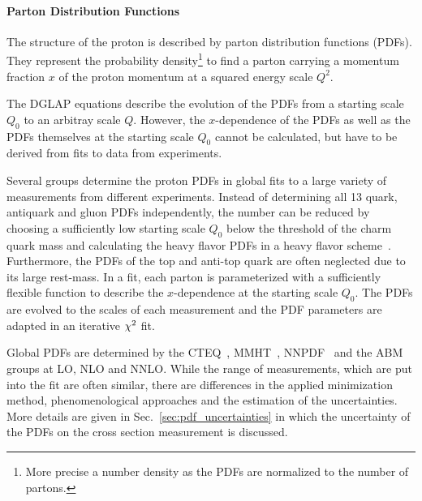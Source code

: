 \paragraph{Parton Distribution Functions}

The structure of the proton is described by parton distribution functions
(PDFs). They represent the probability density\footnote{More precise a number
density as the PDFs are normalized to the number of partons.} to find a parton
carrying a momentum fraction $x$ of the proton momentum at a squared energy
scale $Q^2$. 

The DGLAP equations describe the evolution of the PDFs from a starting scale
$Q_0$ to an arbitray scale $Q$. However, the $x$-dependence of the PDFs as well
as the PDFs themselves at the starting scale $Q_0$ cannot be calculated, but
have to be derived from fits to data from experiments.

Several groups determine the proton PDFs in global fits to a large variety of
measurements from different experiments. Instead of determining all 13 quark,
antiquark and gluon PDFs independently, the number can be reduced by choosing a
sufficiently low starting scale $Q_0$ below the threshold of the charm quark
mass and calculating the heavy flavor PDFs in a heavy flavor
scheme~\cite{Thorne:2006qt}. Furthermore, the PDFs of the top and anti-top quark
are often neglected due to its large rest-mass. In a fit, each parton is
parameterized with a sufficiently flexible function to describe the
$x$-dependence at the starting scale $Q_0$. The PDFs are evolved to the 
scales of each measurement and the PDF parameters are adapted in an iterative
$\chi^2$ fit.

Global PDFs are determined by the
CTEQ~\cite{Dulat:2015mca}, MMHT~\cite{Harland-Lang:2014zoa},
NNPDF~\cite{Ball:2014uwa} and the ABM~\cite{Alekhin:2013nda} groups at LO, NLO
and NNLO. While the range of measurements, which are put into the fit are often similar,
there are differences in the applied minimization method, phenomenological
approaches and the estimation of the uncertainties. More details are given in
Sec.~\ref{sec:pdf_uncertainties} in which the uncertainty of the PDFs on the
cross section measurement is discussed.

